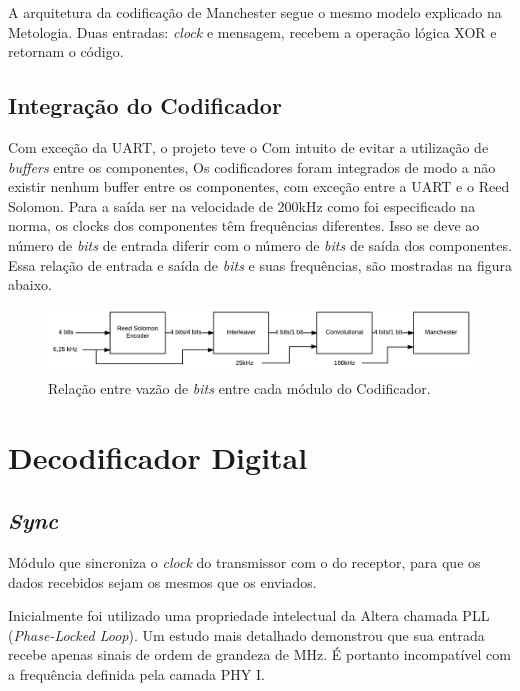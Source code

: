 	A arquitetura da codificação de Manchester segue o mesmo modelo explicado na Metologia. Duas entradas: \textit{clock} e mensagem, recebem a operação lógica XOR e retornam o código.
	
	\subsection{Integração do Codificador}
	
	Com exceção da UART, o projeto teve o
	Com intuito de evitar a utilização de \textit{buffers} entre os componentes, 
	Os codificadores foram integrados de modo a não existir nenhum buffer entre os componentes, com exceção entre a UART e o Reed Solomon. Para a saída ser na velocidade de 200kHz como foi especificado na norma, os clocks dos componentes têm frequências diferentes. Isso se deve ao número de \textit{bits} de entrada diferir com o número de \textit{bits} de saída dos componentes. Essa relação de entrada e saída de \textit{bits} e suas frequências, são mostradas na figura abaixo.
	\begin{figure}[h]
		\caption{\label{figure:integration-encoder}Relação entre vazão de \textit{bits} entre cada módulo do Codificador.}
		\centering
		\includegraphics[width=1\textwidth]{integration/speeds-encoder.pdf}
	\end{figure}

	\section{Decodificador Digital}
	
	\subsection{\textit{Sync}}
	
	Módulo que sincroniza o \textit{clock} do transmissor com o do receptor, para que os dados recebidos sejam os mesmos que os enviados. 
	
	Inicialmente foi utilizado uma propriedade intelectual da Altera chamada PLL (\textit{Phase-Locked Loop}). Um estudo mais detalhado demonstrou que sua entrada recebe apenas sinais de ordem de grandeza de MHz. É portanto incompatível com a frequência definida pela camada PHY I.
	
